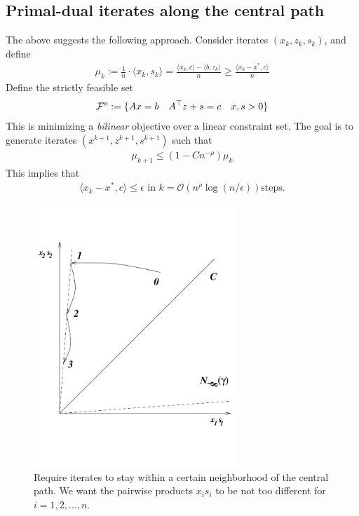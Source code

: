 \subsection{Primal-dual iterates along the central path}
The above suggests the following approach. Consider iterates $(x_k,z_k,s_k)$, and define
\begin{eqnarray*}
\mu_k := \frac{1}{n}\cdot \langle x_k, s_k \rangle = \frac{\langle x_k, c \rangle - \langle b,z_k \rangle}{n} \ge \frac{\langle x_k-x^* , c \rangle}{n}
\end{eqnarray*}
Define the strictly feasible set
\begin{eqnarray*}
{\cal F}^o := \{Ax = b \quad A^{\top} z + s = c \quad x,s  > 0\}
\end{eqnarray*}
This is minimizing a \emph{bilinear} objective over a linear constraint set. The goal is to generate iterates $(x^{k+1},z^{k+1},s^{k+1})$ such that 
\begin{eqnarray*}
\mu_{k+1} \le (1 - Cn^{-\rho})\mu_k
\end{eqnarray*}
This implies that 
\begin{eqnarray*}
\langle x_k - x^*, c \rangle \le \epsilon \text{ in } k = \mathcal{O}\left(n^{\rho}\log (n/\epsilon)\right) \text{steps}.
\end{eqnarray*}

\begin{figure}[]
\begin{center}
\includegraphics[width=3in]{figures/lecture26-central_path}
\end{center}
\caption{Require iterates to stay within a certain neighborhood of the central path.
We want the pairwise products $x_i s_i$ to be not too different for $i = 1, 2, . . . , n.$ }
\label{fig:figcentralpath}
\end{figure}


